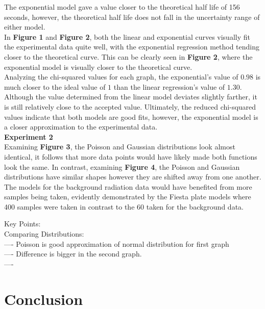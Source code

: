 \documentclass[
	letterpaper, %
	10pt, %
]{CSUniSchoolLabReport}
\begin{document}
The exponential model gave a value closer to the theoretical half life of 156 seconds, however, the
theoretical half life does not fall in the uncertainty range of either model.\\
In \textbf{Figure 1} and \textbf{Figure 2}, both the linear and exponential curves visually fit the experimental data quite well,
with the exponential regression method tending closer to the theoretical curve. This can be clearly seen in \textbf{Figure 2}, where the exponential model is visually closer to the theoretical curve.\\
Analyzing the chi-squared values for each graph, the exponential's value of $0.98$ is much closer to
the ideal value of $1$ than the linear regression's value of $1.30$. Although the value determined from the linear
model deviates slightly farther, it is still relatively close to the accepted value. Ultimately, the reduced chi-squared
values indicate that both models are good fits, however, the exponential model is a closer approximation to
the experimental data.\\

{\Large\textbf{Experiment 2}}\\

Examining \textbf{Figure 3}, the Poisson and Gaussian distributions look almost identical, it follows that more data points would have likely made both functions look the same. In contrast, examining \textbf{Figure 4}, the Poisson and Gaussian distributions have similar shapes however they are shifted away from one another. The models for the background radiation data would have benefited from more samples being taken, evidently demonstrated by the Fiesta plate models where 400 samples were taken in contrast to the 60 taken for the background data.

Key Points:\\
Comparing Distributions:\\
---- Poisson is good approximation of normal distribution for first graph\\
---- Difference is bigger in the second graph.\\
----

\section{Conclusion}
\newpage
\end{document}
